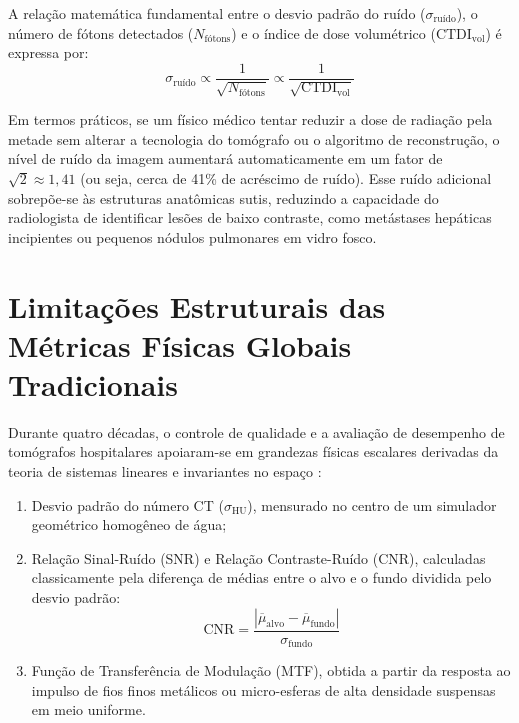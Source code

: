 A relação matemática fundamental entre o desvio padrão do ruído ($\sigma_{\text{ruído}}$), o número de fótons detectados ($N_{\text{fótons}}$) e o índice de dose volumétrico ($\text{CTDI}_{\text{vol}}$) é expressa por:
\begin{equation}
  \sigma_{\text{ruído}} \propto \frac{1}{\sqrt{N_{\text{fótons}}}} \propto \frac{1}{\sqrt{\text{CTDI}_{\text{vol}}}}
  \label{eq:ruido_dose}
\end{equation}

Em termos práticos, se um físico médico tentar reduzir a dose de radiação pela metade sem alterar a tecnologia do tomógrafo ou o algoritmo de reconstrução, o nível de ruído da imagem aumentará automaticamente em um fator de $\sqrt{2} \approx 1{,}41$ (ou seja, cerca de 41\% de acréscimo de ruído). Esse ruído adicional sobrepõe-se às estruturas anatômicas sutis, reduzindo a capacidade do radiologista de identificar lesões de baixo contraste, como metástases hepáticas incipientes ou pequenos nódulos pulmonares em vidro fosco.

\section{Limitações Estruturais das Métricas Físicas Globais Tradicionais}
\label{sec:limitacoes_metricas}

Durante quatro décadas, o controle de qualidade e a avaliação de desempenho de tomógrafos hospitalares apoiaram-se em grandezas físicas escalares derivadas da teoria de sistemas lineares e invariantes no espaço \cite{barrett_myers_2004}:
\begin{enumerate}[label=\alph*)]
  \item Desvio padrão do número CT ($\sigma_{\text{HU}}$), mensurado no centro de um simulador geométrico homogêneo de água;
  \item Relação Sinal-Ruído (SNR) e Relação Contraste-Ruído (CNR), calculadas classicamente pela diferença de médias entre o alvo e o fundo dividida pelo desvio padrão:
  \begin{equation}
    \text{CNR} = \frac{|\overline{\mu}_{\text{alvo}} - \overline{\mu}_{\text{fundo}}|}{\sigma_{\text{fundo}}}
    \label{eq:cnr_classica}
  \end{equation}
  \item Função de Transferência de Modulação (MTF), obtida a partir da resposta ao impulso de fios finos metálicos ou micro-esferas de alta densidade suspensas em meio uniforme.
\end{enumerate}

